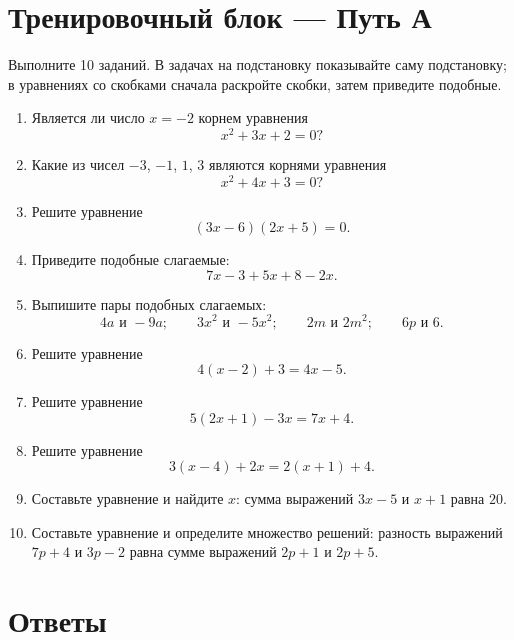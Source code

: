 \documentclass[a4paper,12pt]{article}
\newcommand{\sectionline}{\par\vspace{0.1em}{\color{accent}\hrule height 0.6pt}\vspace{0.45em}}
\begin{document}
\clearpage

\section*{Тренировочный блок — Путь А}
\sectionline

Выполните 10 заданий. В задачах на подстановку показывайте саму подстановку; в уравнениях со скобками сначала раскройте скобки, затем приведите подобные.

\begin{enumerate}
  \item Является ли число $x=-2$ корнем уравнения
  \[
    x^2+3x+2=0?
  \]

  \item Какие из чисел $-3$, $-1$, $1$, $3$ являются корнями уравнения
  \[
    x^2+4x+3=0?
  \]

  \item Решите уравнение
  \[
    (3x-6)(2x+5)=0.
  \]

  \item Приведите подобные слагаемые:
  \[
    7x-3+5x+8-2x.
  \]

  \item Выпишите пары подобных слагаемых:
  \[
    4a\text{ и }-9a;\qquad
    3x^2\text{ и }-5x^2;\qquad
    2m\text{ и }2m^2;\qquad
    6p\text{ и }6.
  \]

  \item Решите уравнение
  \[
    4(x-2)+3=4x-5.
  \]

  \item Решите уравнение
  \[
    5(2x+1)-3x=7x+4.
  \]

  \item Решите уравнение
  \[
    3(x-4)+2x=2(x+1)+4.
  \]

  \item Составьте уравнение и найдите $x$: сумма выражений $3x-5$ и $x+1$ равна $20$.

  \item Составьте уравнение и определите множество решений: разность выражений $7p+4$ и $3p-2$ равна сумме выражений $2p+1$ и $2p+5$.
\end{enumerate}

\clearpage

\section*{Ответы}
\sectionline
\end{document}
